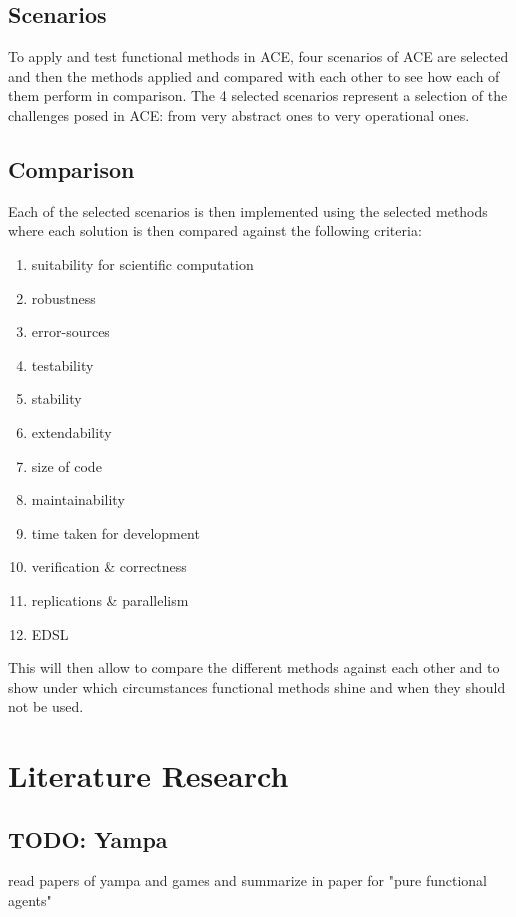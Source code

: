 \documentclass{article}
\begin{document}
\subsection{Scenarios}
To apply and test functional methods in ACE, four scenarios of ACE are selected and then the methods applied and compared with each other to see how each of them perform in comparison. The 4 selected scenarios represent a selection of the challenges posed in ACE: from very abstract ones to very operational ones.

\subsection{Comparison}
Each of the selected scenarios is then implemented using the selected methods where each solution is then compared against the following criteria: 

\begin{enumerate}
\item suitability for scientific computation
\item robustness
\item error-sources
\item testability
\item stability
\item extendability
\item size of code
\item maintainability
\item time taken for development
\item verification \& correctness
\item replications \& parallelism
\item EDSL
\end{enumerate}

This will then allow to compare the different methods against each other and to show under which circumstances functional methods shine and when they should not be used.


\section{Literature Research}

\subsection{TODO: Yampa}
read papers of yampa and games and summarize in paper for "pure functional agents"
\end{document}
